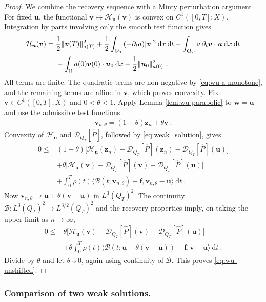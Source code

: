\documentclass{article}
\theoremstyle{definition}
\newcommand{\bfu}{\boldsymbol{u}}
\newcommand{\bfv}{\boldsymbol{v}}
\newcommand{\bfw}{\boldsymbol{w}}
\newcommand{\bff}{\boldsymbol{f}}
\newcommand{\D}{\mathcal{D}}
\newcommand{\dd}{\:\mathrm{d}}
\newcommand{\B}{\mathcal{B}}
\newcommand{\bfz}{\boldsymbol{z}}
\newcommand{\Hh}{\mathcal{H}}
\begin{document}
\begin{proof}
We combine the recovery sequence with a Minty perturbation argument
\cite[Section 2.3]{R13}.
For fixed $\bfu$, the functional $\bfv\mapsto\Hh_{\bfu}(\bfv)$ is convex on $C^1([0,T];X)$.
Integration by parts involving only the smooth test function gives
\begin{align}
 \Hh_{\bfu}(\bfv)
 ={}&\frac{1}{2}\Vert\bfv(T)\Vert_{a(T)}^2
     +\frac{1}{2}\int_{Q_T}(-\partial_ta)|\bfv|^2\dd x\dd t
     -\int_{Q_T} a\,\partial_t \bfv\cdot \bfu\dd x\dd t\notag\\
    &-\int_\Omega a(0)\bfv(0)\cdot \bfu_0\dd x
     +\frac{1}{2}\Vert\bfu_0\Vert_{a(0)}^2 \ .\label{eq:wu-H-convex}
\end{align}
All terms are finite. The quadratic terms are non-negative by
\eqref{eq:wu-a-monotone}, and the remaining terms are affine in $\bfv$,
which proves convexity.
Fix $\bfv\in C^1([0,T];X)$ and $0<\theta<1$. Apply Lemma \ref{lem:wu-parabolic} to $\bfw=\bfu$
and use the admissible test functions
\begin{align*}
 \bfv_{n,\theta}=(1-\theta)\bfz_n+\theta \bfv \ .
\end{align*}
Convexity of $\Hh_{\bfu}$ and $\D_{Q_T}[\hat P]$, followed by \eqref{eq:weak_solution}, gives
\begin{align*}
 0\leq{}&(1-\theta)
       \bigl[\Hh_{\bfu}(\bfz_n)+\D_{Q_T}[\hat P](\bfz_n)-\D_{Q_T}[\hat P](\bfu)\bigr]\\
 &+\theta\bigl[\Hh_{\bfu}(\bfv)+\D_{Q_T}[\hat P](\bfv)-\D_{Q_T}[\hat P](\bfu)\bigr]\\
 &+\int_0^T\rho(t)
       \langle\B(t;\bfv_{n,\theta})-\bff,\bfv_{n,\theta}-\bfu\rangle\dd t \ .
\end{align*}
Now $\bfv_{n,\theta}\rightarrow \bfu+\theta(\bfv-\bfu)$ in $L^3(Q_T)^2$. The continuity
$\B:L^3(Q_T)^2\rightarrow L^{3/2}(Q_T)^2$ and the recovery properties imply, on taking the upper
limit as $n\rightarrow\infty$,
\begin{align*}
 0\leq{}&\theta\bigl[\Hh_{\bfu}(\bfv)+\D_{Q_T}[\hat P](\bfv)-\D_{Q_T}[\hat P](\bfu)\bigr]\\
 &+\theta\int_0^T\rho(t)
       \langle\B(t;\bfu+\theta(\bfv-\bfu))-\bff,\bfv-\bfu\rangle\dd t \ .
\end{align*}
Divide by $\theta$ and let $\theta\downarrow0$, again using continuity
of $\B$. This proves \eqref{eq:wu-unshifted}.
\end{proof}

\subsubsection{Comparison of two weak solutions.}
\end{document}
